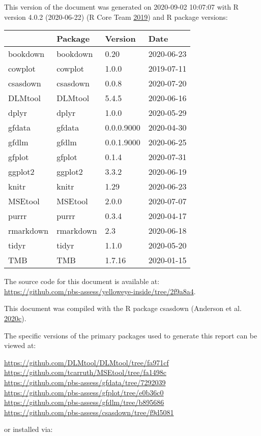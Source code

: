 \documentclass[11pt]{book}
\begin{document}
This version of the document was generated on 2020-09-02 10:07:07 with R version 4.0.2 (2020-06-22) (R Core Team \protect\hyperlink{ref-r2019}{2019}) and R package versions:
\begin{longtable}[]{@{}llll@{}}
\toprule
& Package & Version & Date\tabularnewline
\midrule
\endhead
bookdown & bookdown & 0.20 & 2020-06-23\tabularnewline
cowplot & cowplot & 1.0.0 & 2019-07-11\tabularnewline
csasdown & csasdown & 0.0.8 & 2020-07-20\tabularnewline
DLMtool & DLMtool & 5.4.5 & 2020-06-16\tabularnewline
dplyr & dplyr & 1.0.0 & 2020-05-29\tabularnewline
gfdata & gfdata & 0.0.0.9000 & 2020-04-30\tabularnewline
gfdlm & gfdlm & 0.0.1.9000 & 2020-06-25\tabularnewline
gfplot & gfplot & 0.1.4 & 2020-07-31\tabularnewline
ggplot2 & ggplot2 & 3.3.2 & 2020-06-19\tabularnewline
knitr & knitr & 1.29 & 2020-06-23\tabularnewline
MSEtool & MSEtool & 2.0.0 & 2020-07-07\tabularnewline
purrr & purrr & 0.3.4 & 2020-04-17\tabularnewline
rmarkdown & rmarkdown & 2.3 & 2020-06-18\tabularnewline
tidyr & tidyr & 1.1.0 & 2020-05-20\tabularnewline
TMB & TMB & 1.7.16 & 2020-01-15\tabularnewline
\bottomrule
\end{longtable}
The source code for this document is available at:\\
\url{https://github.com/pbs-assess/yelloweye-inside/tree/2f9a8a4}.

This document was compiled with the R package csasdown (Anderson et al. \protect\hyperlink{ref-csasdown}{2020}\protect\hyperlink{ref-csasdown}{c}).

The specific versions of the primary packages used to generate this report can be viewed at:

\url{https://github.com/DLMtool/DLMtool/tree/fa971cf}\\
\url{https://github.com/tcarruth/MSEtool/tree/fa1498c}~\\
\url{https://github.com/pbs-assess/gfdata/tree/7292039}~\\
\url{https://github.com/pbs-assess/gfplot/tree/e0b36c0}~\\
\url{https://github.com/pbs-assess/gfdlm/tree/b895686}~\\
\url{https://github.com/pbs-assess/csasdown/tree/f9d5081}~\\

\vspace{4mm}

or installed via:
\end{document}
